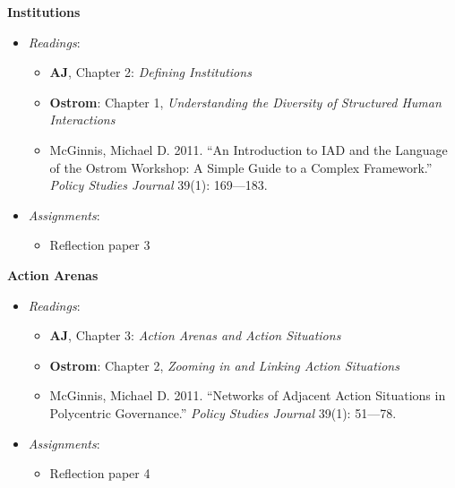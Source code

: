 \week \textbf{Institutions}

\begin{itemize}

\item
  \emph{Readings}:

  \begin{itemize}
  
  \item
    \textbf{AJ}, Chapter 2: \emph{Defining Institutions}
  \item
    \textbf{Ostrom}: Chapter 1, \emph{Understanding the Diversity of
    Structured Human Interactions}
  \item
    McGinnis, Michael D. 2011. ``An Introduction to IAD and the Language
    of the Ostrom Workshop: A Simple Guide to a Complex Framework.''
    \emph{Policy Studies Journal} 39(1): 169---183.
  \end{itemize}
\item
  \emph{Assignments}:

  \begin{itemize}
  
  \item
    Reflection paper 3
  \end{itemize}
\end{itemize}

\week \textbf{Action Arenas}

\begin{itemize}

\item
  \emph{Readings}:

  \begin{itemize}
  
  \item
    \textbf{AJ}, Chapter 3: \emph{Action Arenas and Action Situations}
  \item
    \textbf{Ostrom}: Chapter 2, \emph{Zooming in and Linking Action
    Situations}
  \item
    McGinnis, Michael D. 2011. ``Networks of Adjacent Action Situations
    in Polycentric Governance.'' \emph{Policy Studies Journal} 39(1):
    51---78.
  \end{itemize}
\item
  \emph{Assignments}:

  \begin{itemize}
  
  \item
    Reflection paper 4
  \end{itemize}
\end{itemize}

